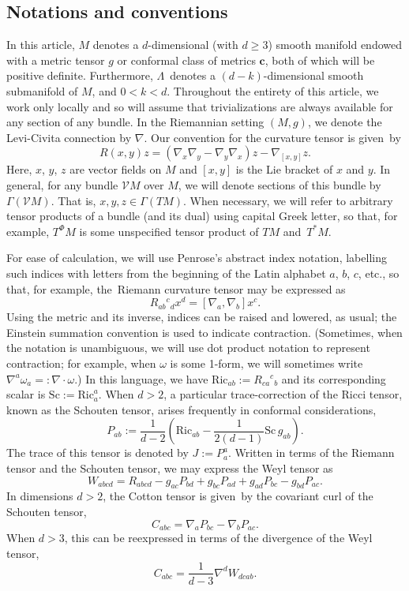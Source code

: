\documentclass[11pt]{article}
\numberwithin{equation}{section}
\newcommand{\cc}{\boldsymbol{c}}
\renewcommand{\=}{\stackrel \Lambda =}
\begin{document}
\subsection{Notations and conventions}
In this article, $M$ denotes a $d$-dimensional (with $d \geq 3$) smooth manifold endowed with a metric tensor $g$ or conformal class of metrics $\cc$, both of which will be positive definite. Furthermore, $\Lambda$~denotes a $(d-k)$-dimensional smooth submanifold of $M$, and $0 < k < d$. Throughout the entirety of this article, we work only locally and so will assume that trivializations are always available for any section of any bundle. In the Riemannian setting $(M,g)$, we denote the Levi-Civita connection by $\nabla$. Our convention for the curvature tensor is given~by
\[
R(x,y)z = (\nabla_x \nabla_y - \nabla_y \nabla_x)z - \nabla_{[x,y]} z .
\]
Here, $x$, $y$, $z$ are vector fields on $M$ and $[x,y]$ is the Lie bracket of $x$ and $y$. In general, for any bundle $\mathcal{V}M$ over $M$, we will denote sections of this bundle by $\Gamma(\mathcal{V} M)$. That is, $x,y,z \in \Gamma(TM)$. When necessary, we will refer to arbitrary tensor products of a bundle (and its dual) using capital Greek letter, so that, for example, $T^\Phi M$ is some unspecified tensor product of $TM$ and~$T^* M$.

For ease of calculation, we will use Penrose's abstract index notation, labelling such indices with letters from the beginning of the Latin alphabet $a$, $b$, $c$, etc., so that, for example, the~Riemann curvature tensor may be expressed as
\[
R_{ab}{}^c{}_d x^d = [\nabla_a, \nabla_b] x^c .
\]
Using the metric and its inverse, indices can be raised and lowered, as usual; the Einstein summation convention is used to indicate contraction. (Sometimes, when the notation is unambiguous, we will use dot product notation to represent contraction; for example, when $\omega$ is some 1-form, we will sometimes write $\nabla^a \omega_a =: \nabla \cdot \omega$.) In this language, we have $\mathrm{Ric}_{ab} := R_{ca}{}^c{}_b$ and its corresponding scalar is $\mathrm{Sc} := \mathrm{Ric}_a^a$. When $d > 2$, a particular trace-correction of the Ricci tensor, known as the Schouten tensor, arises frequently in conformal considerations,
\[
P_{ab} := \frac{1}{d-2} \left(\mathrm{Ric}_{ab} - \frac{1}{2(d-1)} \mathrm{Sc}\, g_{ab} \right) .
\]
The trace of this tensor is denoted by $J := P_a^a$. Written in terms of the Riemann tensor and the Schouten tensor, we may express the Weyl tensor as
\[
W_{abcd} = R_{abcd} - g_{ac} P_{bd} + g_{bc} P_{ad} + g_{ad} P_{bc} - g_{bd} P_{ac} .
\]
In dimensions $d > 2$, the Cotton tensor is given~by the covariant curl of the Schouten tensor,
\[
C_{abc} = \nabla_a P_{bc} - \nabla_b P_{ac} .
\]
When $d > 3$, this can be reexpressed in terms of the divergence of the Weyl tensor,
\[
C_{abc} = \frac{1}{d-3} \nabla^d W_{dcab} .
\]
\end{document}

